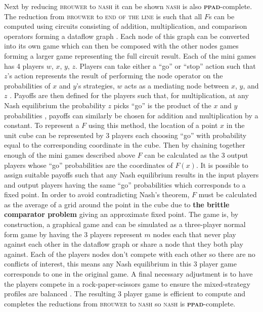 \documentclass{article}
\begin{document}
Next by reducing \textsc{brouwer} to \textsc{nash} it can be shown \textsc{nash} is also \textbf{\textsc{ppad}}-complete. The reduction from \textsc{brouwer} to \textsc{end of the line} is such that all $F$s can be computed using circuits consisting of addition, multiplication, and comparison operators forming a dataflow graph \cite{Daskalakis.2009}. Each node of this graph can be converted into its own game which can then be composed with the other nodes games forming a larger game representing the full circuit result. Each of the mini games has 4 players $w$, $x$, $y$, $z$. Players can take either a ``go'' or ``stop'' action such that $z$'s action represents the result of performing the node operator on the probabilities of $x$ and $y$'s strategies, $w$ acts as a mediating node between $x$, $y$, and $z$ \cite{Daskalakis.2009}. Payoffs are then defined for the players such that, for multiplication, at any Nash equilibrium the probability $z$ picks ``go'' is the product of the $x$ and $y$ probabilities \cite{Daskalakis.2009}, payoffs can similarly be chosen for addition and multiplication by a constant. To represent a $F$ using this method, the location of a point $x$ in the unit cube can be represented by 3 players each choosing ``go'' with probability equal to the corresponding coordinate in the cube. Then by chaining together enough of the mini games described above $F$ can be calculated as the 3 output players whose ``go'' probabilities are the coordinates of $F(x)$. It is possible to assign suitable payoffs such that any Nash equilibrium results in the input players and output players having the same ``go'' probabilities which corresponds to a fixed point. In order to avoid contradicting Nash's theorem, $F$ must be calculated as the average of a grid around the point in the cube due to \textbf{the brittle comparator problem} \cite{Daskalakis.2009} giving an approximate fixed point. The game is, by construction, a graphical game \cite{Daskalakis.2009} and can be simulated as a three-player normal form game by having the 3 players represent $m$ nodes each that never play against each other in the dataflow graph or share a node that they both play against. Each of the players nodes don't compete with each other so there are no conflicts of interest, this means any Nash equilibrium in this 3 player game corresponds to one in the original game. A final necessary adjustment is to have the players compete in a rock-paper-scissors game to ensure the mixed-strategy profiles are balanced \cite{Daskalakis.2009}. The resulting 3 player game is efficient to compute and completes the reductions from \textsc{brouwer} to \textsc{nash} so \textsc{nash} is \textbf{\textsc{ppad}}-complete.
\end{document}
